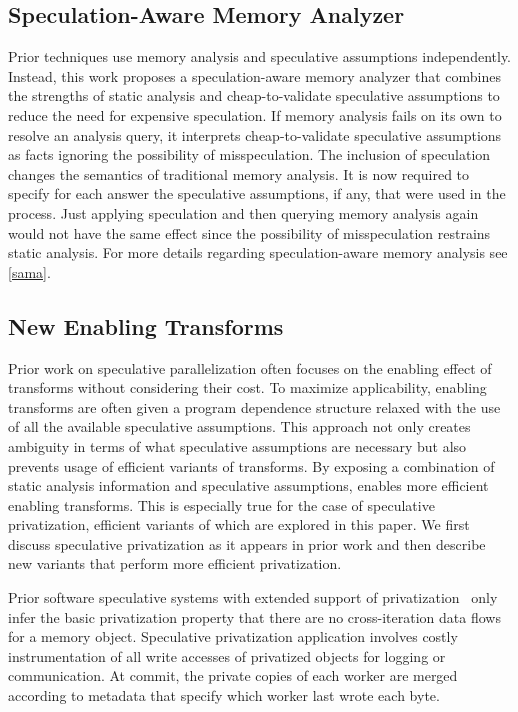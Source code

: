 \subsection{Speculation-Aware Memory Analyzer}
\label{sama_short}

Prior techniques use memory analysis and speculative assumptions
independently.  Instead, this work proposes a speculation-aware memory
analyzer that combines the strengths of static analysis and
cheap-to-validate speculative assumptions to reduce the need for
expensive speculation.  If memory analysis fails on its own to resolve
an analysis query, it interprets cheap-to-validate speculative
assumptions as facts ignoring the possibility of misspeculation.
%
The inclusion of speculation changes the semantics of traditional
memory analysis. It is now required to specify for each answer the
speculative assumptions, if any, that were used in the process.
%
Just applying speculation and then querying memory analysis again
would not have the same effect since the possibility of misspeculation
restrains static analysis. For more details regarding
speculation-aware memory analysis see \cref{sama}.

\subsection{New Enabling Transforms}
\label{new_enablers}

Prior work on speculative parallelization often focuses on the
enabling effect of transforms without considering their cost.  To
maximize applicability, enabling transforms are often given a program
dependence structure relaxed with the use of all the available
speculative assumptions.  This approach not only creates ambiguity in
terms of what speculative assumptions are necessary but also prevents
usage of efficient variants of transforms.
%
By exposing a combination of static analysis information and
speculative assumptions, \name enables more efficient enabling
transforms.  This is especially true for the case of speculative
privatization, efficient variants of which are explored in this paper.
%
We first discuss speculative privatization as it appears in prior work
and then describe new variants that perform more efficient
privatization.

Prior software speculative systems with extended support of
privatization~\cite{johnson:12:pldi,kim:12:cgo} only infer the basic
privatization property that there are no cross-iteration data flows
for a memory object.
%
Speculative privatization application involves costly instrumentation
of all write accesses of privatized objects for logging or
communication. At commit, the private copies of each worker are merged
according to metadata that specify which worker last wrote each byte.

